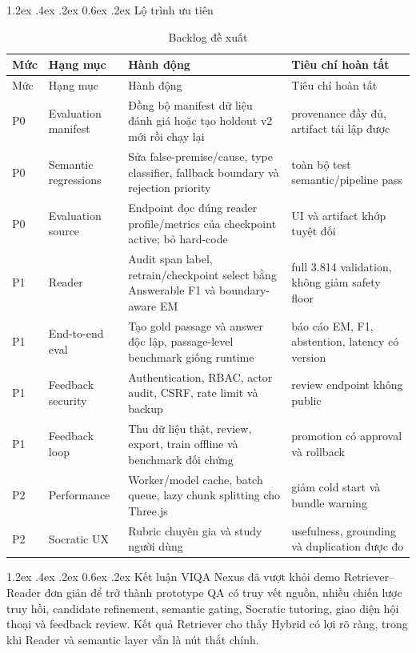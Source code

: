 \documentclass[12pt,a4paper,oneside]{report}
\makeatletter
\renewcommand\section{\@startsection {section}{1}{\z@}%
  {1.2ex \@plus .4ex \@minus .2ex}%
  {0.6ex \@plus .2ex}%
  {\normalfont\Large\bfseries}}
\makeatother
\begin{document}
\section{Lộ trình ưu tiên}
\begin{longtable}{C{1.0cm}L{3.5cm}L{6.0cm}L{3.5cm}}
\caption{Backlog đề xuất}\label{tab:roadmap}\\
\toprule
Mức & Hạng mục & Hành động & Tiêu chí hoàn tất \\
\midrule
\endfirsthead
\toprule
Mức & Hạng mục & Hành động & Tiêu chí hoàn tất \\
\midrule
\endhead
P0 & Evaluation manifest & Đồng bộ manifest dữ liệu đánh giá hoặc tạo holdout v2 mới rồi chạy lại & provenance đầy đủ, artifact tái lập được \\
P0 & Semantic regressions & Sửa false-premise/cause, type classifier, fallback boundary và rejection priority & toàn bộ test semantic/pipeline pass \\
P0 & Evaluation source & Endpoint đọc đúng reader profile/metrics của checkpoint active; bỏ hard-code & UI và artifact khớp tuyệt đối \\
P1 & Reader & Audit span label, retrain/checkpoint select bằng Answerable F1 và boundary-aware EM & full 3.814 validation, không giảm safety floor \\
P1 & End-to-end eval & Tạo gold passage và answer độc lập, passage-level benchmark giống runtime & báo cáo EM, F1, abstention, latency có version \\
P1 & Feedback security & Authentication, RBAC, actor audit, CSRF, rate limit và backup & review endpoint không public \\
P1 & Feedback loop & Thu dữ liệu thật, review, export, train offline và benchmark đối chứng & promotion có approval và rollback \\
P2 & Performance & Worker/model cache, batch queue, lazy chunk splitting cho Three.js & giảm cold start và bundle warning \\
P2 & Socratic UX & Rubric chuyên gia và study người dùng & usefulness, grounding và duplication được đo \\
\bottomrule
\end{longtable}

\section{Kết luận}
VIQA Nexus đã vượt khỏi demo Retriever--Reader đơn giản để trở thành prototype QA có
truy vết nguồn, nhiều chiến lược truy hồi, candidate refinement, semantic gating,
Socratic tutoring, giao diện hội thoại và feedback review. Kết quả Retriever cho thấy
Hybrid có lợi rõ ràng, trong khi Reader và semantic layer vẫn là nút thắt chính.
\end{document}
